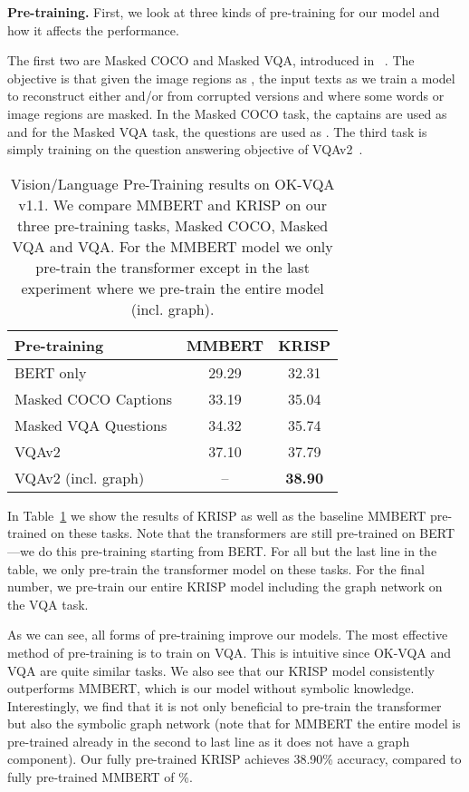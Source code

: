\documentclass[final]{cvpr}
\providecommand{\ModelName}{KRISP\xspace}
\providecommand{\MMBERTAbr}{MMBERT\xspace}
\providecommand{\myparagraph}[1]{\noindent\textbf{#1.}}
\begin{document}
\myparagraph{Pre-training}
First, we look at three kinds of pre-training for our model and how it affects the performance.

The first two are Masked COCO and Masked VQA, introduced in ~\cite{singh2020we}. The objective is that given the image regions as , the input texts as  we train a model to reconstruct either  and/or  from corrupted versions  and  where some words
 or image regions  are masked. In the Masked COCO task, the captains are used as  and for the Masked VQA task, the questions are used as . The third task is simply training on the question answering objective of VQAv2~\cite{goyal2017making}.

\begin{table}[t]
\begin{center}
\begin{tabular}{@{}lcc@{}}
\toprule
Pre-training & \MMBERTAbr & \ModelName \\ \midrule
BERT only & 29.29  & 32.31 \\
Masked COCO Captions  & 33.19 & 35.04\\
Masked VQA Questions  & 34.32  & 35.74\\
VQAv2 & 37.10  & 37.79\\
VQAv2 (incl. graph)  & -- & \textbf{38.90}\\
\bottomrule
\end{tabular}
\end{center}
\caption{Vision/Language Pre-Training results on OK-VQA v1.1. We compare \MMBERTAbr and \ModelName on our three pre-training tasks, Masked COCO, Masked VQA and VQA. For the \MMBERTAbr model we only pre-train the transformer except in the last experiment where we pre-train the entire model (incl. graph).}
\label{table:Pretrain}
\vspace{-.3cm}
\end{table}

In Table~\ref{table:Pretrain} we show the results of \ModelName as well as the baseline \MMBERTAbr pre-trained on these tasks. Note that the transformers are still pre-trained on BERT---we do this pre-training starting from BERT. For all but the last line in the table, we only pre-train the transformer model on these tasks. For the final number, we pre-train our entire \ModelName model including the graph network on the VQA task.

As we can see, all forms of pre-training improve our models. The most effective method of pre-training is to train on VQA. This is intuitive since OK-VQA and VQA are quite similar tasks. We also see that our \ModelName model consistently outperforms \MMBERTAbr, which is our model without symbolic knowledge. 
Interestingly, we find that it is not only beneficial to pre-train the transformer but also the symbolic graph network (note that for \MMBERTAbr the entire model is pre-trained already in the second to last line as it does not have a graph component). Our fully pre-trained \ModelName achieves 38.90\% accuracy, compared to fully pre-trained \MMBERTAbr of \%. 
\end{document}
